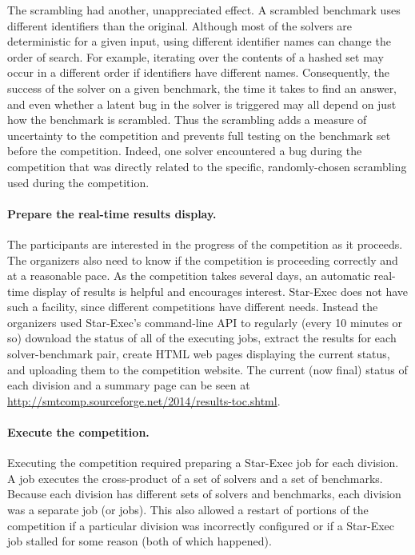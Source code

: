 \documentclass[twosize,11pt]{article}
\begin{document}
The scrambling had another, unappreciated effect. A scrambled benchmark uses different identifiers than the original. Although most of the solvers are deterministic for a given input, using different identifier names can change the order of search. For example, iterating over the contents of a hashed set may occur in a different order if identifiers have different names. Consequently, the success of the solver on a given benchmark, the time it takes to find an answer, and even whether a latent bug in the solver is triggered may all depend on just how the benchmark is scrambled. Thus the scrambling adds a measure of uncertainty to the competition and prevents full testing on the benchmark set before the competition. Indeed, one solver encountered a bug during the competition that was directly related to the specific, randomly-chosen scrambling used during the competition.

\paragraph{Prepare the real-time results display.} The participants are interested in the progress of the competition as it proceeds. The organizers also need to know if the competition is proceeding correctly and at a reasonable pace. As the competition takes several days, an automatic real-time display of results is helpful and encourages interest.  Star-Exec does not have such a facility, since different competitions have different needs. Instead the organizers used Star-Exec's command-line API to regularly (every 10 minutes or so) download the status of all of the executing jobs, extract the results for each solver-benchmark pair, create HTML web pages displaying the current status, and uploading them to the competition website. The current (now final) status of each division and a summary page can be seen at 
\url{http://smtcomp.sourceforge.net/2014/results-toc.shtml}.

\paragraph{Execute the competition.} Executing the competition required preparing a Star-Exec job for each 
division. A job executes the cross-product of a set of solvers and a set of benchmarks. Because each division has different sets of solvers and benchmarks, each division was a separate job (or jobs). This also allowed a restart of portions of the competition if a particular division was incorrectly configured or if a Star-Exec job stalled for some reason (both of which happened).
\end{document}
